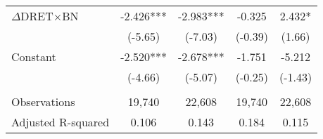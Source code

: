 \begin{table}[H]
\begin{center}
\begin{tabular}{lcccc}
			\rowcolor[rgb]{ .906,  .902,  .902} $\Delta$DRET$\times$BN & -2.426*** & -2.983*** & -0.325 & 2.432* \\
			\rowcolor[rgb]{ .906,  .902,  .902} & (-5.65) & (-7.03) & (-0.39) & (1.66) \\
			Constant & -2.520*** & -2.678*** & -1.751 & -5.212 \\
			& (-4.66) & (-5.07) & (-0.25) & (-1.43) \\
			&   &   &   &  \\
			Observations & 19,740 & 22,608 & 19,740 & 22,608 \\
			Adjusted R-squared & 0.106 & 0.143 & 0.184 & 0.115 \\
			\bottomrule
			\bottomrule
		\end{tabular}%
	\end{center}
\end{table}%